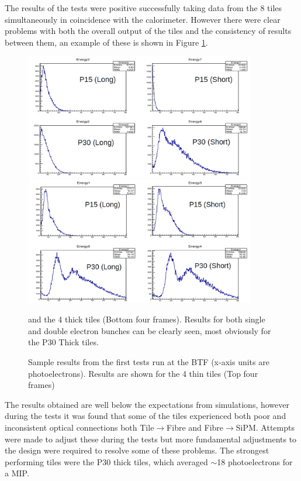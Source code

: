 The results of the tests were positive successfully taking data from the 8 tiles simultaneously in coincidence with the calorimeter. However there were clear problems with both the overall output of the tiles and the consistency of results between them, an example of these is shown in Figure \ref{Frascati2Results1}. 

\begin{figure}
	\centering
	\includegraphics[width=0.9\textwidth]{ImgChap1/frascatiresults1}
	\includegraphics[width=0.9\textwidth]{ImgChap1/frascatiresults2}
	\caption{Sample results from the first tests run at the BTF (x-axis units are photoelectrons). Results are shown for the 4 thin tiles (Top four frames)} and the 4 thick tiles (Bottom four frames). Results for both single and double electron bunches can be clearly seen, most obviously for the P30 Thick tiles. 
	\label{Frascati2Results1}
\end{figure}

The results obtained are well below the expectations from simulations, however during the tests it was found that some of the tiles experienced both poor and inconsistent optical connections both Tile$\rightarrow$Fibre and Fibre$\rightarrow$SiPM. Attempts were made to adjust these during the tests but more fundamental adjustments to the design were required to resolve some of these problems. The strongest performing tiles were the P30 thick tiles, which averaged $\sim$18 photoelectrons for a MIP. 




